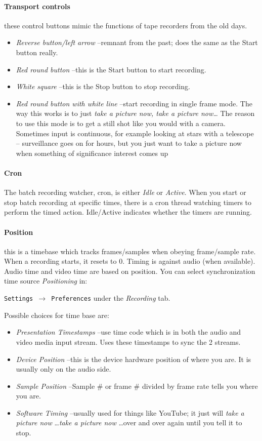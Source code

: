 \paragraph{Transport controls} these control buttons mimic the functions of tape recorders from the old days.

\begin{itemize}
    \item \textit{Reverse button/left arrow} --remnant from the past; does the same as the Start button really.
    \item \textit{Red round button} --this is the Start button to start recording.
    \item \textit{White square} --this is the Stop button to stop recording.
    \item \textit{Red round button with white line} --start recording in single frame mode.  The way this works is to just \textit{take a picture now, take a picture now\dots}  The reason to use this mode is to get a still shot like you would with a camera.  Sometimes input is continuous, for example looking at stars with a telescope -- surveillance goes on for hours, but you just want to take a picture now when something of significance interest comes up
\end{itemize}
\paragraph{Cron} The batch recording watcher, cron, is either \textit{Idle} or \textit{Active}.  When you start or stop batch recording at specific times, there is a cron thread watching timers to perform the timed action.  Idle/Active indicates whether the timers are running.
\paragraph{Position} this is a timebase which tracks frames/samples when obeying frame/sample rate.  When a recording starts, it resets to 0.  Timing is against audio (when available).  Audio time and video time are based on position.
You can select synchronization time source \textit{Positioning} in:

\texttt{Settings $\rightarrow$ Preferences} under the \textit{Recording} tab.

\noindent Possible choices for time base are:

\begin{itemize}
    \item \textit{Presentation Timestamps} --use time code which is in both the audio and video media input stream. Uses these timestamps to sync the 2 streams.
    \item \textit{Device Position} --this is the device hardware position of where you are.  It is usually only on the audio side.
    \item \textit{Sample Position} --Sample $\#$ or frame $\#$ divided by frame rate tells you where you are.
    \item \textit{Software Timing} --usually used for things like YouTube; it just will \textit{take a picture now} \dots \textit{take a picture now} \dots over and over again until you tell it to stop.    
\end{itemize}

